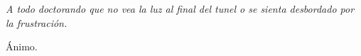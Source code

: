 
\begin{dedication} %

{\itshape
A todo doctorando que no vea la luz al final del tunel o se sienta desbordado por la frustración.

Ánimo.
}

\end{dedication}

